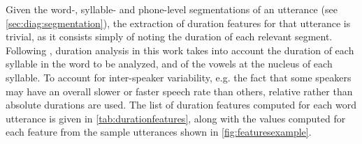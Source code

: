 Given the word-, syllable- and phone-level segmentations of an utterance (see \cref{sec:diag:segmentation}), the extraction of duration features for that utterance is trivial, as it consists simply of noting the duration of each relevant segment. %
Following \textcite{Bonneau2011}, duration analysis in this work takes into account the %
 duration of each syllable in the word to be analyzed, and
 of the vowels at the nucleus of each syllable. 
	To account for inter-speaker variability, e.g. the fact that some speakers may have an overall slower or faster speech rate than others, relative rather than absolute durations are used.
	The list of duration features computed for each word utterance is given in \cref{tab:durationfeatures}, 
along with the values computed for each feature from the sample utterances shown in \cref{fig:featuresexample}. %


